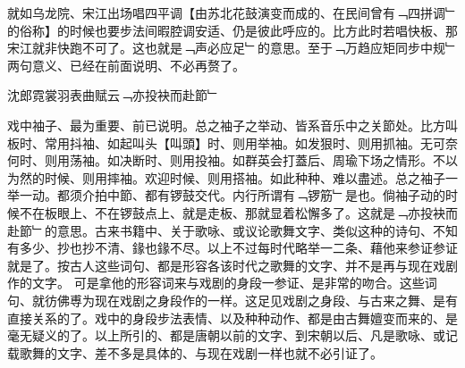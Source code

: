 就如乌龙院、宋江出场唱四平调【由苏北花鼓演变而成的、在民间曾有﹁四拼调﹂的俗称】的时候也要步法间暇腔调安适、仍是彼此呼应的。比方此时若唱快板、那宋江就非快跑不可了。这也就是﹁声必应足﹂的意思。至于﹁万趋应矩同步中规﹂两句意义、已经在前面说明、不必再赘了。

\begin{preface}
沈郎霓裳羽表曲赋云﹁亦投袂而赴節﹂
\end{preface}

戏中袖子、最为重要、前已说明。总之袖子之举动、皆系音乐中之关節处。比方叫板时、常用抖袖、如起叫头【叫頭】时、则用举袖。如发狠时、则用抓袖。无可奈何时、则用荡袖。如决断时、则用投袖。如群英会打蓋后、周瑜下场之情形。不以为然的时候、则用摔袖。欢迎时候、则用搭袖。如此种种、难以盡述。总之袖子一举一动。都须介拍中節、都有锣鼓交代。内行所谓有﹁锣筋﹂是也。倘袖子动的时候不在板眼上、不在锣鼓点上、就是走板、那就显着松懈多了。这就是﹁亦投袂而赴節﹂的意思。古来书籍中、关于歌咏、或议论歌舞文字、类似这种的诗句、不知有多少、抄也抄不清、䤸也䤸不尽。以上不过每时代略举一二条、藉他来参证参证就是了。按古人这些词句、都是形容各该时代之歌舞的文字、并不是再与现在戏剧作的文字。
可是拿他的形容词来与戏剧的身段一参证、是非常的吻合。这些词句、就彷佛尃为现在戏剧之身段作的一样。这足见戏剧之身段、与古来之舞、是有直接关系的了。戏中的身段步法表情、以及种种动作、都是由古舞嬗变而来的、是毫无疑义的了。以上所引的、都是唐朝以前的文字、到宋朝以后、凡是歌咏、或记载歌舞的文字、差不多是具体的、与现在戏剧一样也就不必引证了。

